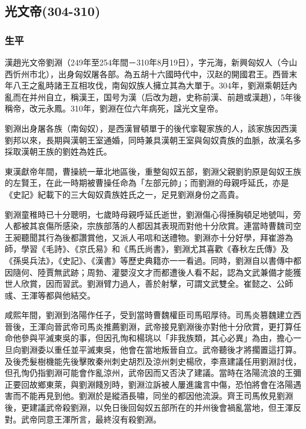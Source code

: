 
\subsection{光文帝\tiny(304-310)}

\subsubsection{生平}

漢趙光文帝劉淵（249年至254年間－310年8月19日），字元海，新興匈奴人（今山西忻州市北），出身匈奴屠各部。為五胡十六國時代中，汉赵的開國君王。西晉末年八王之亂時諸王互相攻伐，南匈奴族人擁立其為大單于。304年，劉淵乘朝廷內亂而在并州自立，稱漢王，国号为漢（后改为趙，史称前漢、前趙或漢趙），5年後稱帝，改元永鳳。310年，劉淵在位六年病死，諡光文皇帝。

劉淵出身屠各族（南匈奴），是西漢冒頓單于的後代挛鞮家族的人，該家族因西漢劉邦以來，長期與漢朝王室通婚，同時兼具漢朝王室與匈奴貴族的血脈，故漢名多採取漢朝王族的劉姓為姓氏。

東漢獻帝年間，曹操統一華北地區後，重整匈奴五部，劉淵父親劉豹原是匈奴王族的左賢王，在此一時期被曹操任命為「左部元帥」；而劉淵的母親呼延氏，亦是《史記》紀載下的三大匈奴貴族姓氏之一，足見劉淵身份之高貴。

劉淵童稚時已十分聰明，七歲時母親呼延氏逝世，劉淵傷心得捶胸頓足地號叫，旁人都被其哀傷所感染，宗族部落的人都因其表現而對他十分欣賞。連當時曹魏司空王昶聽聞其行為後都讚賞他，又派人弔唁和送禮物。劉淵亦十分好學，拜崔游為師，學習《毛詩》、《京氏易》和《馬氏尚書》，劉淵尤其喜歡《春秋左氏傳》及《孫吳兵法》，《史記》、《漢書》等歷史典籍亦一一看過。同時，劉淵自以書傳中都因隨何、陸賈無武跡；周勃、灌嬰沒文才而都遭後人看不起，認為文武兼備才能獲世人欣賞，因而習武。劉淵臂力過人，善於射擊，可謂文武雙全。崔懿之、公師彧、王渾等都與他結交。

咸熙年間，劉淵到洛陽作任子，受到當時曹魏權臣司馬昭厚待。司馬炎篡魏建立西晉後，王渾向晉武帝司馬炎推薦劉淵，武帝接見劉淵後亦對他十分欣賞，更打算任命他參與平滅東吳的事，但因孔恂和楊珧以「非我族類，其心必異」為由，擔心一旦向劉淵委以重任並平滅東吳，他會在當地叛晉自立。武帝聽後才將擱置這打算。及後禿髮樹機能先後擊敗秦州刺史胡烈及涼州刺史楊欣，李熹建議任用劉淵討伐，但孔恂仍指劉淵可能會作亂涼州，武帝因而又否決了建議。當時在洛陽流浪的王彌正要回故鄉東萊，與劉淵餞別時，劉淵泣訴被人屢進讒言中傷，恐怕將會在洛陽遇害而不能再見到他。劉淵於是縱酒長嘯，同坐的都因他流淚。齊王司馬攸見劉淵後，更建議武帝殺劉淵，以免日後回匈奴五部所在的并州後會禍亂當地，但王渾反對。武帝同意王渾所言，最終沒有殺劉淵。


